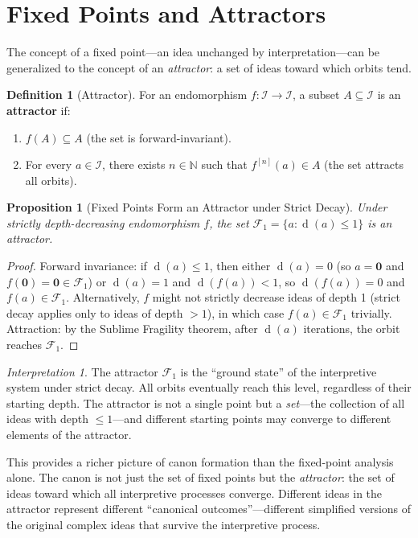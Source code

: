 \documentclass[11pt,openany]{book}
\theoremstyle{definition}
\newtheorem{definition}[axiom]{Definition}
\theoremstyle{plain}
\newtheorem{proposition}[axiom]{Proposition}
\theoremstyle{remark}
\newtheorem{interpretation}[axiom]{Interpretation}
\newcommand{\IS}{\mathcal{I}}               %
\newcommand{\void}{\mathbf{0}}              %
\newcommand{\depth}{\operatorname{d}}       %
\newcommand{\Filt}[1]{\mathcal{F}_{#1}}     %
\begin{document}
\section{Fixed Points and Attractors}

The concept of a fixed point---an idea unchanged by interpretation---can be generalized to the concept of an \emph{attractor}: a set of ideas toward which orbits tend.

\begin{definition}[Attractor]
For an endomorphism $f : \IS \to \IS$, a subset $A \subseteq \IS$ is an \textbf{attractor} if:
\begin{enumerate}
\item $f(A) \subseteq A$ (the set is forward-invariant).
\item For every $a \in \IS$, there exists $n \in \mathbb{N}$ such that $f^{[n]}(a) \in A$ (the set attracts all orbits).
\end{enumerate}
\end{definition}

\begin{proposition}[Fixed Points Form an Attractor under Strict Decay]
Under strictly depth-decreasing endomorphism $f$, the set $\Filt{1} = \{a : \depth(a) \leq 1\}$ is an attractor.
\end{proposition}

\begin{proof}
Forward invariance: if $\depth(a) \leq 1$, then either $\depth(a) = 0$ (so $a = \void$ and $f(\void) = \void \in \Filt{1}$) or $\depth(a) = 1$ and $\depth(f(a)) < 1$, so $\depth(f(a)) = 0$ and $f(a) \in \Filt{1}$. Alternatively, $f$ might not strictly decrease ideas of depth 1 (strict decay applies only to ideas of depth $> 1$), in which case $f(a) \in \Filt{1}$ trivially. Attraction: by the Sublime Fragility theorem, after $\depth(a)$ iterations, the orbit reaches $\Filt{1}$.
\end{proof}

\begin{interpretation}
The attractor $\Filt{1}$ is the ``ground state'' of the interpretive system under strict decay. All orbits eventually reach this level, regardless of their starting depth. The attractor is not a single point but a \emph{set}---the collection of all ideas with depth $\leq 1$---and different starting points may converge to different elements of the attractor.

This provides a richer picture of canon formation than the fixed-point analysis alone. The canon is not just the set of fixed points but the \emph{attractor}: the set of ideas toward which all interpretive processes converge. Different ideas in the attractor represent different ``canonical outcomes''---different simplified versions of the original complex ideas that survive the interpretive process.
\end{interpretation}
\end{document}

